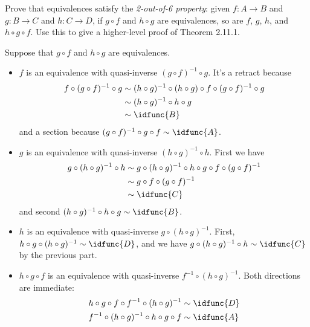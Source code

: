 Prove that equivalences satisfy the \textit{2-out-of-6 property}: given $f : A \to B$
and $g : B \to C$ and $h : C \to D$, if $g \circ f$ and $h \circ g$ are
equivalences, so are $f$, $g$, $h$, and $h \circ g \circ f$.  Use this to give
a higher-level proof of Theorem 2.11.1.


 \soln
Suppose that $g \circ f$ and $h \circ g$ are equivalences.



\begin{itemize}
\item  $f$ is an equivalence with quasi-inverse $(g \circ f)^{-1} \circ g$.  It's a
   retract because
   \begin{align*}
     f \circ (g \circ f)^{-1} \circ g
     &\sim
     (h \circ g)^{-1} \circ (h \circ g) \circ f \circ (g \circ f)^{-1} \circ g
     \\&\sim
     (h \circ g)^{-1} \circ h \circ g
     \\&\sim
     \idfunc{B}
   \end{align*}
   and a section because $(g \circ f)^{-1} \circ g \circ f \sim \idfunc{A}$.



\item  $g$ is an equivalence with quasi-inverse $(h \circ g)^{-1} \circ h$.  First
   we have
   \begin{align*}
     g \circ (h \circ g)^{-1} \circ h
     &\sim
     g \circ (h \circ g)^{-1} \circ h \circ g \circ f \circ (g \circ f)^{-1}
     \\&\sim
     g \circ f \circ (g \circ f)^{-1}
     \\&\sim
     \idfunc{C}
   \end{align*}
   and second $(h \circ g)^{-1} \circ h \circ g \sim \idfunc{B}$.



\item  $h$ is an equivalence with quasi-inverse $g \circ (h \circ g)^{-1}$.  First,
   $h \circ g \circ (h \circ g)^{-1} \sim \idfunc{D}$, and we have
   $g \circ (h \circ g)^{-1} \circ h \sim \idfunc{C}$ by the previous part.



\item  $h \circ g \circ f$ is an equivalence with quasi-inverse $f^{-1} \circ (h
   \circ g)^{-1}$.  Both directions are immediate:
   \begin{align*}
     h \circ g \circ f \circ f^{-1} \circ (h \circ g)^{-1} &\sim \idfunc{D} \\
     f^{-1} \circ (h \circ g)^{-1} \circ h \circ g \circ f &\sim \idfunc{A}
   \end{align*}

\end{itemize}




